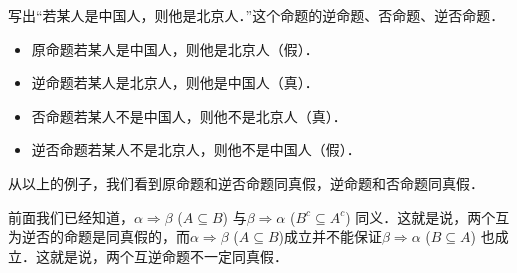 \begin{example}
	写出“若某人是中国人，则他是北京人．”这个命题的逆命题、否命题、逆否命题．
	
	\begin{itemize}
		\item 原命题\quad 若某人是中国人，则他是北京人（假）．
		\item 逆命题\quad 若某人是北京人，则他是中国人（真）．
		\item 否命题\quad 若某人不是中国人，则他不是北京人（真）．
		\item 逆否命题\quad 若某人不是北京人，则他不是中国人（假）．
	\end{itemize}
\end{example}

从以上的例子，我们看到原命题和逆否命题同真假，逆命题和否命题同真假．

前面我们已经知道，$\alpha\Rightarrow \beta$ ($A\subseteq B$) 与$\beta\Rightarrow\alpha$ ($B^c\subseteq A^c$)
同义．这就是说，两个互为逆否的命题是同真假的，而$\alpha\Rightarrow\beta$ ($A\subseteq B$)成立并不能保证$\beta\Rightarrow \alpha$ ($B\subseteq A$)
也成立．这就是说，两个互逆命题不一定同真假．

